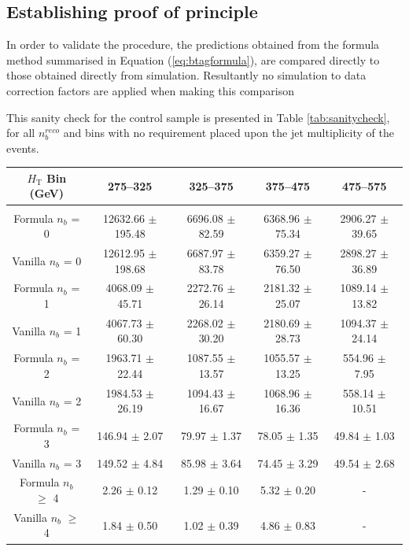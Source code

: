 \subsection{Establishing proof of principle}
\label{subsec:formulamethodsanity}

In order to validate the procedure, the predictions obtained from the formula method summarised in Equation (\ref{eq:btagformula}), are compared directly to those obtained directly from simulation. Resultantly no simulation to data correction factors are applied when making this comparison

This sanity check for the \mupjets control sample is presented in Table \ref{tab:sanitycheck}, for all $n_{b}^{reco}$ and \theht bins with no requirement placed upon the jet multiplicity of the events.  


\begin{table}[ht!]
\begin{center}
\footnotesize
\begin{tabular*}{0.95\textwidth}{@{\extracolsep{\fill}}ccccc}
\hline
$H_{\textrm{T}}$ Bin (GeV)         & 275--325                  & 325--375                  & 375--475                  & 475--575                 \\ 
\hline\hline
\\
Formula $n_{b}$ = 0                 & 12632.66  $\pm$  195.48   & 6696.08  $\pm$  82.59     & 6368.96  $\pm$  75.34     & 2906.27  $\pm$  39.65    \\
Vanilla $n_{b}$ = 0                 & 12612.95  $\pm$  198.68   & 6687.97  $\pm$  83.78     & 6359.27  $\pm$  76.50     & 2898.27  $\pm$  36.89    \\
\hline
Formula $n_{b}$ = 1                 & 4068.09  $\pm$  45.71     & 2272.76  $\pm$  26.14     & 2181.32  $\pm$  25.07     & 1089.14  $\pm$  13.82    \\
Vanilla $n_{b}$ = 1                 & 4067.73  $\pm$  60.30     & 2268.02  $\pm$  30.20     & 2180.69  $\pm$  28.73     & 1094.37  $\pm$  24.14    \\
\hline
Formula $n_{b}$ = 2                  & 1963.71  $\pm$  22.44     & 1087.55  $\pm$  13.57     & 1055.57  $\pm$  13.25     & 554.96  $\pm$  7.95      \\
Vanilla $n_{b}$ = 2                  & 1984.53  $\pm$  26.19     & 1094.43  $\pm$  16.67     & 1068.96  $\pm$  16.36     & 558.14  $\pm$  10.51     \\
\hline
Formula $n_{b}$ = 3                  & 146.94  $\pm$  2.07       & 79.97  $\pm$  1.37        & 78.05  $\pm$  1.35        & 49.84  $\pm$  1.03       \\
Vanilla $n_{b}$ = 3                  & 149.52  $\pm$  4.84       & 85.98  $\pm$  3.64        & 74.45  $\pm$  3.29        & 49.54  $\pm$  2.68       \\
\hline
Formula $n_{b}$ $\geq$ 4             & 2.26  $\pm$  0.12         & 1.29  $\pm$  0.10         & 5.32  $\pm$  0.20         & -     \\ 
Vanilla $n_{b}$ $\geq$ 4             & 1.84  $\pm$  0.50         & 1.02  $\pm$  0.39         & 4.86  $\pm$  0.83       & -        \\ 


\end{tabular*}
\end{center}
\end{table}
